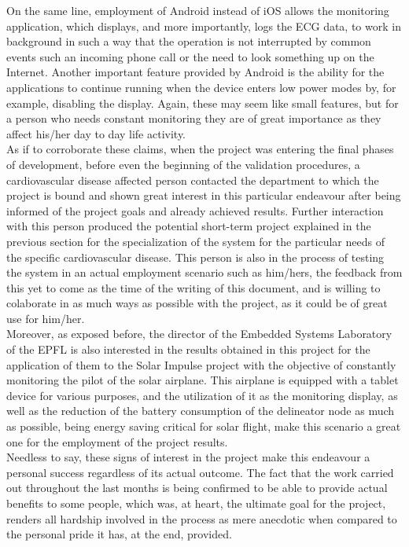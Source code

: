		On the same line, employment of Android instead of iOS allows the monitoring application, which displays, and more importantly, logs the ECG data, to work in background in such a way that the operation is not interrupted by common events such an incoming phone call or the need to look something up on the Internet. Another important feature provided by Android is the ability for the applications to continue running when the device enters low power modes by, for example, disabling the display. Again, these may seem like small features, but for a person who needs constant monitoring they are of great importance as they affect his/her day to day life activity.\\

		As if to corroborate these claims, when the project was entering the final phases of development, before even the beginning of the validation procedures, a cardiovascular disease affected person contacted the department to which the project is bound and shown great interest in this particular endeavour after being informed of the project goals and already achieved results. Further interaction with this person produced the potential short-term project explained in the previous section for the specialization of the system for the particular needs of the specific cardiovascular disease. This person is also in the process of testing the system in an actual employment scenario such as him/hers, the feedback from this yet to come as the time of the writing of this document, and is willing to colaborate in as much ways as possible with the project, as it could be of great use for him/her.\\

		Moreover, as exposed before, the director of the Embedded Systems Laboratory of the EPFL is also interested in the results obtained in this project for the application of them to the Solar Impulse project with the objective of constantly monitoring the pilot of the solar airplane. This airplane is equipped with a tablet device for various purposes, and the utilization of it as the monitoring display, as well as the reduction of the battery consumption of the delineator node as much as possible, being energy saving critical for solar flight, make this scenario a great one for the employment of the project results.\\

		Needless to say, these signs of interest in the project make this endeavour a personal success regardless of its actual outcome. The fact that the work carried out throughout the last months is being confirmed to be able to provide actual benefits to some people, which was, at heart, the ultimate goal for the project, renders all hardship involved in the process as mere anecdotic when compared to the personal pride it has, at the end, provided.
